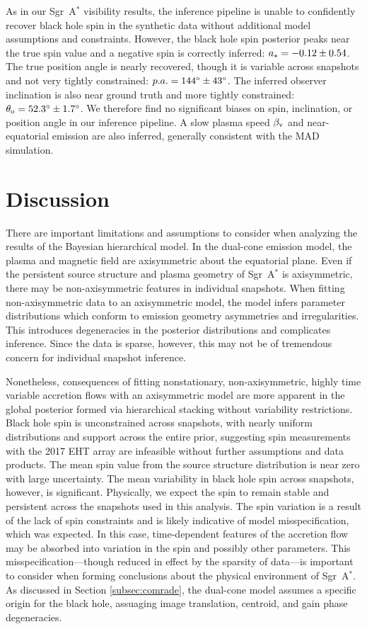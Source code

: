 \documentclass[linenumbers, twocolumn, tighten]{aastex701}
\def\sgra{Sgr~A$^*$\xspace}
\begin{document}
As in our \sgra visibility results, the inference pipeline is unable to confidently recover black hole spin in the synthetic data without additional model assumptions and constraints. However, the black hole spin posterior peaks near the true spin value and a negative spin is correctly inferred: $a_{\rm *}=-0.12\pm 0.54$. The true position angle is nearly recovered, though it is variable across snapshots and not very tightly constrained: $p.a. = 144\degree \pm43 \degree$. The inferred observer inclination is also near ground truth and more tightly constrained: $\theta_{\rm o}=52.3\degree \pm1.7\degree$. We therefore find no significant biases on spin, inclination, or position angle in our inference pipeline. A slow plasma speed $\beta_{\rm v}$ and near-equatorial emission are also inferred, generally consistent with the MAD simulation.


\section{Discussion} \label{sec:discussion}

There are important limitations and assumptions to consider when analyzing the results of the Bayesian hierarchical model. In the dual-cone emission model, the plasma and magnetic field are axisymmetric about the equatorial plane. Even if the persistent source structure and plasma geometry of \sgra is axisymmetric, there may be non-axisymmetric features in individual snapshots. When fitting non-axisymmetric data to an axisymmetric model, the model infers parameter distributions which conform to emission geometry asymmetries and irregularities. This introduces degeneracies in the posterior distributions and complicates inference. Since the data is sparse, however, this may not be of tremendous concern for individual snapshot inference.

Nonetheless, consequences of fitting nonstationary, non-axisymmetric, highly time variable accretion flows with an axisymmetric model are more apparent in the global posterior formed via hierarchical stacking without variability restrictions. Black hole spin is unconstrained across snapshots, with nearly uniform distributions and support across the entire prior, suggesting spin measurements with the 2017 EHT array are infeasible without further assumptions and data products. The mean spin value from the source structure distribution is near zero with large uncertainty. The mean variability in black hole spin across snapshots, however, is significant. Physically, we expect the spin to remain stable and persistent across the snapshots used in this analysis. The spin variation is a result of the lack of spin constraints and is likely indicative of model misspecification, which was expected. In this case, time-dependent features of the accretion flow may be absorbed into variation in the spin and possibly other parameters. This misspecification---though reduced in effect by the sparsity of data---is important to consider when forming conclusions about the physical environment of \sgra. As discussed in Section \ref{subsec:comrade}, the dual-cone model assumes a specific origin for the black hole, assuaging image translation, centroid, and gain phase degeneracies.
\end{document}
